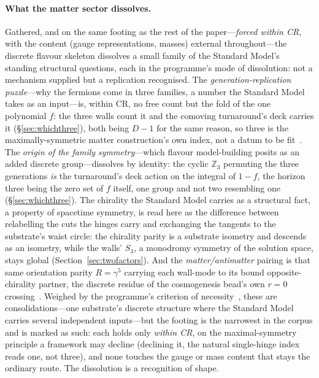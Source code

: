 \documentclass[11pt]{article}
\begin{document}
\paragraph{What the matter sector dissolves.} Gathered, and on the same footing as the rest of the paper---\emph{forced within CR}, with the content (gauge representations, masses) external throughout---the discrete flavour skeleton dissolves a small family of the Standard Model's standing structural questions, each in the programme's mode of dissolution: not a mechanism supplied but a replication recognised. The \emph{generation-replication puzzle}---why the fermions come in three families, a number the Standard Model takes as an input---is, within CR, no free count but the fold of the one polynomial $f$: the three walls count it and the comoving turnaround's deck carries it (\S\ref{sec:whichthree}), both being $D-1$ for the same reason, so three is the maximally-symmetric matter construction's own index, not a datum to be fit~\cite{JanzenGeometricCore}. The \emph{origin of the family symmetry}---which flavour model-building posits as an added discrete group---dissolves by identity: the cyclic $\mathbb{Z}_3$ permuting the three generations \emph{is} the turnaround's deck action on the integral of $1-f$, the horizon three being the zero set of $f$ itself, one group and not two resembling one (\S\ref{sec:whichthree}). The chirality the Standard Model carries as a structural fact, a property of spacetime symmetry, is read here as the difference between relabelling the cuts the hinges carry and exchanging the tangents to the substrate's waist circle: the chirality parity is a substrate isometry and descends as an isometry, while the walls' $S_3$, a
monodromy symmetry of the solution space, stays global (Section~\ref{sec:twofactors}). And the \emph{matter/antimatter} pairing is that same orientation parity $R=\gamma^5$ carrying each wall-mode to its bound opposite-chirality partner, the discrete residue of the cosmogenesis bead's own $r=0$ crossing~\cite{JanzenBoundary}. Weighed by the programme's criterion of necessity~\cite{JanzenShadowExistence}, these are consolidations---one substrate's discrete structure where the Standard Model carries several independent inputs---but the footing is the narrowest in the corpus and is marked as such: each holds only \emph{within CR}, on the maximal-symmetry principle a framework may decline (declining it, the natural single-hinge index reads one, not three), and none touches the gauge or mass content that stays the ordinary route. The dissolution is a recognition of shape.
\end{document}
